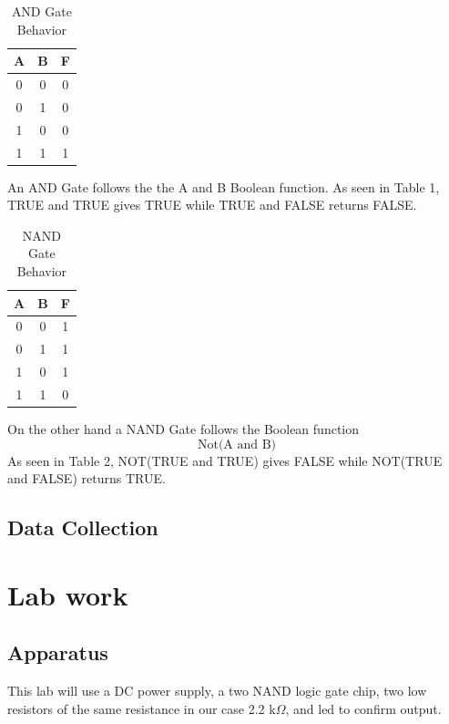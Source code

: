 \documentclass[11pt,letterpaper,onecolumn]{article}
\begin{document}
 \begin{table}[H]
\centering
\begin{tabular}{|c|c|c|}
 \hline
 A & B & F \\\hline
 0 & 0 & 0 \\
 0 & 1 & 0 \\
 1 & 0 & 0 \\
 1 & 1 & 1 \\
  \hline

\end{tabular}
\caption{AND Gate Behavior}
\label{tab:AND}
\end{table}

An AND Gate follows the the A and B Boolean function. As seen in Table 1, TRUE and TRUE gives TRUE while TRUE and FALSE returns FALSE.
 
 \begin{table}[H]
\centering
\begin{tabular}{|c|c|c|}
 \hline
 A & B & F \\\hline
 0 & 0 & 1 \\
 0 & 1 & 1 \\
 1 & 0 & 1 \\
 1 & 1 & 0 \\
  \hline

\end{tabular}
\caption{NAND Gate Behavior}
\label{tab:NAND}
\end{table}

On the other hand a NAND Gate follows the Boolean function
$$\text{Not(A and B)}$$
As seen in Table 2, NOT(TRUE and TRUE) gives FALSE while NOT(TRUE and FALSE) returns TRUE.

\subsection{Data Collection}




\section{Lab work}

\subsection{Apparatus}

This lab will use a DC power supply, a two NAND logic gate chip, two low resistors of the same resistance in our case 2.2 k$\Omega$, and led to confirm output.
\end{document}
